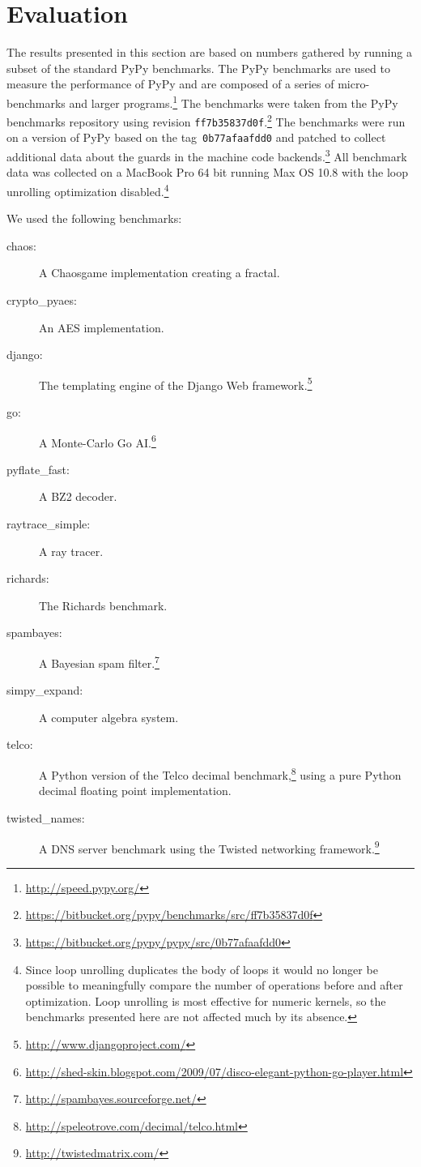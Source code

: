 \documentclass[10pt,preprint]{sigplanconf}
\begin{document}


\section{Evaluation}
\label{sec:evaluation}

The results presented in this section are based on numbers gathered by running
a subset of the standard PyPy benchmarks. The PyPy benchmarks are used to
measure the performance of PyPy and are composed of a series of
micro-benchmarks and larger programs.\footnote{\url{http://speed.pypy.org/}} The
benchmarks were taken from the PyPy benchmarks repository using revision
\texttt{ff7b35837d0f}.\footnote{\url{https://bitbucket.org/pypy/benchmarks/src/ff7b35837d0f}}
The benchmarks were run on a version of PyPy based on the
tag~\texttt{0b77afaafdd0} and patched to collect additional data about the
guards in the machine code
backends.\footnote{\url{https://bitbucket.org/pypy/pypy/src/0b77afaafdd0}} All
benchmark data was collected on a MacBook Pro 64 bit running Max OS 10.8 with
the loop unrolling optimization disabled.\footnote{Since loop unrolling
duplicates the body of loops it would no longer be possible to meaningfully
compare the number of operations before and after optimization. Loop unrolling
is most effective for numeric kernels, so the benchmarks presented here are not
affected much by its absence.}

We used the following benchmarks:

\begin{description}
    \item[chaos:] A Chaosgame implementation creating a fractal.
    \item[crypto\_pyaes:] An AES implementation.
    \item[django:] The templating engine of the Django Web
        framework.\footnote{\url{http://www.djangoproject.com/}}

    \item[go:] A Monte-Carlo Go
        AI.\footnote{\url{http://shed-skin.blogspot.com/2009/07/disco-elegant-python-go-player.html}}
    \item[pyflate\_fast:] A BZ2 decoder.
    \item[raytrace\_simple:] A ray tracer.
    \item[richards:] The Richards benchmark.
    \item[spambayes:] A Bayesian spam filter.\footnote{\url{http://spambayes.sourceforge.net/}}
    \item[simpy\_expand:] A computer algebra system.
    \item[telco:] A Python version of the Telco decimal
        benchmark,\footnote{\url{http://speleotrove.com/decimal/telco.html}}
        using a pure Python decimal floating point implementation.
    \item[twisted\_names:] A DNS server benchmark using the Twisted networking
        framework.\footnote{\url{http://twistedmatrix.com/}}
\end{description}
\end{document}
